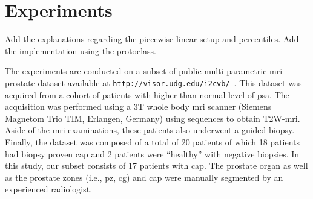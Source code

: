 \section{Experiments}
\label{sec:exp}

{\color{red} Add the explanations regarding the piecewise-linear setup and percentiles. Add the implementation using the protoclass.}

The experiments are conducted on a subset of public multi-parametric \ac{mri} prostate dataset available at \texttt{http://visor.udg.edu/i2cvb/}~\cite{lemaitre2015boosting}.
This dataset was acquired from a cohort of patients with higher-than-normal level of \ac{psa}. The acquisition was performed using a 3T whole body \ac{mri} scanner (Siemens Magnetom Trio TIM, Erlangen, Germany) using sequences to obtain T2W-\ac{mri}. Aside of the \ac{mri} examinations, these patients also underwent a guided-biopsy. Finally, the dataset was composed of a total of 20 patients of which 18 patients had biopsy proven \ac{cap} and 2 patients were ``healthy'' with negative biopsies. In this study, our subset consists of 17 patients with \ac{cap}. The prostate organ as well as the prostate zones (i.e., \ac{pz}, \ac{cg}) and \ac{cap} were manually segmented by an experienced radiologist.